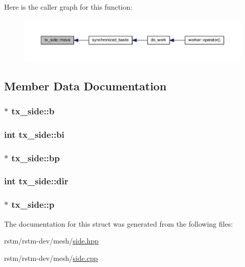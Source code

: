 Here is the caller graph for this function\-:
\nopagebreak
\begin{figure}[H]
\begin{center}
\leavevmode
\includegraphics[width=350pt]{structtx__side_aa7e85a0d9e28480d7b7eab8033c31a2a_icgraph}
\end{center}
\end{figure}




\subsection{Member Data Documentation}
\hypertarget{structtx__side_ac1d70ea11a1d724942b70e5a144b6248}{
\subsubsection[{b}]{$\ast$ tx\-\_\-side\-::b}}\label{structtx__side_ac1d70ea11a1d724942b70e5a144b6248}
\hypertarget{structtx__side_ac9604a6b479db274249c97aacb38b9eb}{
\subsubsection[{bi}]{\setlength{\rightskip}{0pt plus 5cm}int tx\-\_\-side\-::bi}}\label{structtx__side_ac9604a6b479db274249c97aacb38b9eb}
\hypertarget{structtx__side_a1a57f63b7098972edc198b57fc2549bb}{
\subsubsection[{bp}]{$\ast$ tx\-\_\-side\-::bp}}\label{structtx__side_a1a57f63b7098972edc198b57fc2549bb}
\hypertarget{structtx__side_aa4e0d11fbe2c4dec40e1f80a77eca378}{
\subsubsection[{dir}]{\setlength{\rightskip}{0pt plus 5cm}int tx\-\_\-side\-::dir}}\label{structtx__side_aa4e0d11fbe2c4dec40e1f80a77eca378}
\hypertarget{structtx__side_afac3c9659ddb66d937e65785a6b8b547}{
\subsubsection[{p}]{$\ast$ tx\-\_\-side\-::p}}\label{structtx__side_afac3c9659ddb66d937e65785a6b8b547}


The documentation for this struct was generated from the following files\-:\begin{DoxyCompactItemize}
\item 
rstm/rstm-\/dev/mesh/\hyperlink{side_8hpp}{side.\-hpp}\item 
rstm/rstm-\/dev/mesh/\hyperlink{side_8cpp}{side.\-cpp}\end{DoxyCompactItemize}
